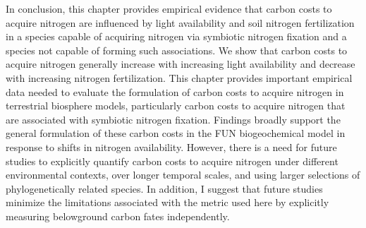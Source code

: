 In conclusion, this chapter provides empirical evidence that carbon costs to acquire nitrogen are influenced by light availability and soil nitrogen fertilization in a species capable of acquiring nitrogen via symbiotic nitrogen fixation and a species not capable of forming such associations. We show that carbon costs to acquire nitrogen generally increase with increasing light availability and decrease with increasing nitrogen fertilization. This chapter provides important empirical data needed to evaluate the formulation of carbon costs to acquire nitrogen in terrestrial biosphere models, particularly carbon costs to acquire nitrogen that are associated with symbiotic nitrogen fixation. Findings broadly support the general formulation of these carbon costs in the FUN biogeochemical model in response to shifts in nitrogen availability. However, there is a need for future studies to explicitly quantify carbon costs to acquire nitrogen under different environmental contexts, over longer temporal scales, and using larger selections of phylogenetically related species. In addition, I suggest that future studies minimize the limitations associated with the metric used here by explicitly measuring belowground carbon fates independently.